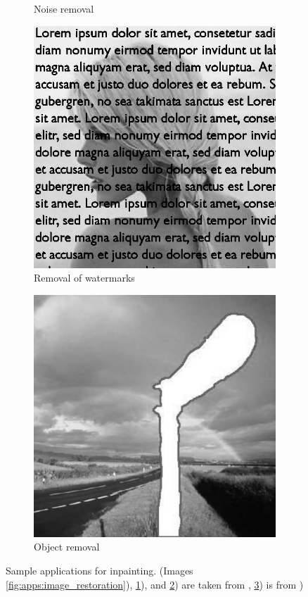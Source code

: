 \begin{figure}[t]
\begin{subfigure}{.5\columnwidth}
	      \caption{Noise removal
	      \label{fig:apps:noise_removal}
	   }
	\end{subfigure}\hfill%
	\begin{subfigure}{.5\columnwidth}
	   \centering
	   \includegraphics[width=.9\columnwidth]{graphics/claudia_512x512_mask_in.png}%
      	   \caption{Removal of watermarks
	      \label{fig:apps:watermarks}
	   }
	\end{subfigure}\hfill%
	\begin{subfigure}{.5\columnwidth}
	   \centering
	   \includegraphics[width=.9\columnwidth]{graphics/object_removal_gray.png}%
      	   \caption{Object removal
	      \label{fig:apps:object_removal}
	   }
	\end{subfigure}\hfill%
	\caption{Sample applications for inpainting. (Images \ref{fig:apps:image_restoration}), \ref{fig:apps:noise_removal}), and \ref{fig:apps:watermarks}) are taken from \cite{CIL2015}, \ref{fig:apps:object_removal}) is from \cite{criminisi2004region})
	   \label{fig:apps}
	}
\end{figure}

